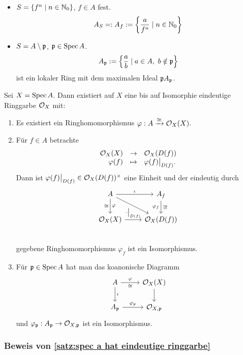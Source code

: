 \begin{beispiel}
	\begin{itemize}
	  \item $S = \{f^n \mid n \in \mathbb{N}_0\}$, $f \in A$ fest.
	  	\[ A_S =: A_f := \left\{ \frac{a}{f^n} \mid n\in \mathbb{N}_0\right\}\]
	  \item $S = A \setminus \mathfrak{p}$, $\mathfrak{p} \in \operatorname{Spec} A$.
	  	\[ A_\mathfrak{p} := \left\{ \frac a b \mid a \in A,\ b\notin \mathfrak{p} \right\}\]
	  	ist ein lokaler Ring mit dem maximalen Ideal $\mathfrak{p} A_\mathfrak{p}$.
	\end{itemize}
\end{beispiel}


\begin{satz}
	\label{satz:spec a hat eindeutige ringgarbe}
	Sei $X = \operatorname{Spec} A$. Dann existiert auf $X$ eine bis auf Isomorphie 
	eindeutige Ringgarbe $\mathcal{O}_X$ mit:
	\begin{enumerate}[label=\roman{*})]
	  \item Es existiert ein Ringhomomorphismus
	  	$\varphi: A \xrightarrow{\cong} \mathcal{O}_X(X)$.
	  \item Für $f\in A$ betrachte 
	  	\[\funcdef{ \O_X(X) & \to & \O_X(D(f)) \\
	  		\varphi(f) & \mapsto & \varphi(f) \rest{D(f)}.}\]
	  	Dann ist $\varphi(f)\big|_{D(f)} \in \mathcal{O}_X(D(f))^\times$ eine Einheit
	  	und der eindeutig durch 
	  	\[
	  	\begin{tikzcd}
	  		A \rar{\iota} \dar{\varphi}[swap]{\cong}
	  			\drar & A_f \dar{\exists!}[swap]{\varphi_f}\\
	  		\O_X(X) \rar{\cdot\rest{D(f)}} & \O_X(D(f))\\
	  	\end{tikzcd}
	  	\]
	  	gegebene Ringhomomorphismus $\varphi_f$ ist ein Isomorphismus.
	  \item Für $\mathfrak{p}\in \operatorname{Spec} A$ hat man das koanonische Diagramm
	  	\[\begin{tikzcd}
	  		A \rar{\varphi}[swap]{\cong}  \dar{\iota} 
	  			& \O_X(X) \dar \\
	  		A_\p \rar{\varphi_\p} & \O_{X,\p}
	  	\end{tikzcd}\]
	  	und $\varphi_\mathfrak{p}: A_\mathfrak{p} \to \mathcal{O}_{X,\mathfrak{p}}$ ist ein Isomorphismus.
	\end{enumerate}
\end{satz}

\subsubsection{Beweis von \autoref{satz:spec a hat eindeutige ringgarbe}}

